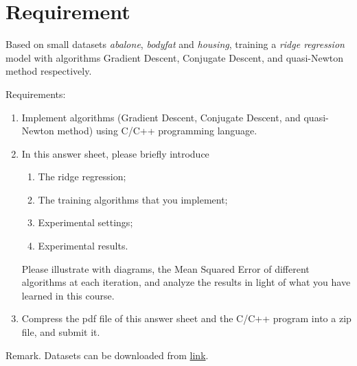 \section{Requirement}

Based on small datasets \emph{abalone}, \emph{bodyfat} and \emph{housing},
training a \emph{ridge regression} model with algorithms Gradient Descent, 
Conjugate Descent, and quasi-Newton method respectively.

Requirements:
\begin{enumerate}
    \item Implement algorithms (Gradient Descent, Conjugate Descent, and 
        quasi-Newton method) using C/C++ programming language.
    \item In this answer sheet, please briefly introduce
        \begin{enumerate}
            \item The ridge regression;
            \item The training algorithms that you implement;
            \item Experimental settings;
            \item Experimental results.
        \end{enumerate}
        Please illustrate with diagrams, the Mean Squared Error of different 
        algorithms at each iteration, and analyze the results in light of what
        you have learned in this course.
    \item Compress the pdf file of this answer sheet and the C/C++ program into 
        a zip file, and submit it.
\end{enumerate}

Remark. Datasets can be downloaded from 
\href{https://www.csie.ntu.edu.tw/~cjlin/libsvmtools/datasets/regression.html}{link}.